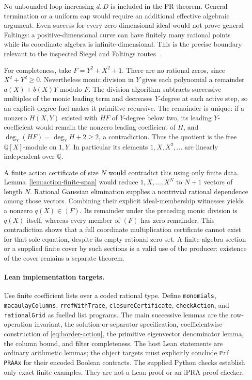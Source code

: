 No unbounded loop increasing $d,D$ is included in the PR theorem.
General termination or a uniform cap would require an additional
effective algebraic argument. Even success for every zero-dimensional
ideal would not prove general Faltings: a positive-dimensional curve
can have finitely many rational points while its coordinate algebra is
infinite-dimensional. This is the precise boundary relevant to the
inspected Siegel and Faltings routes~\cite{repo-siegel,repo-faltings}.

For completeness, take $F=Y^2+X^2+1$. There are no rational zeros, since
$X^2+Y^2\geq0$. Nevertheless monic division in $Y$ gives each polynomial
a remainder $a(X)+b(X)Y$ modulo $F$. The division algorithm subtracts
successive multiples of the monic leading term and decreases $Y$-degree
at each active step, so an explicit degree fuel makes it primitive
recursive. The remainder is unique: if a nonzero $H(X,Y)$ existed with
$HF$ of $Y$-degree below two, its leading $Y$-coefficient would remain
the nonzero leading coefficient of $H$, and
$\deg_Y(HF)=\deg_Y H+2\geq2$, a contradiction. Thus the quotient is
the free $\mathbb Q[X]$-module on $1,Y$. In particular its elements
$1,X,X^2,\ldots$ are linearly independent over $\mathbb Q$.

A finite action certificate of size $N$ would contradict this using only
finite data. Lemma~\ref{lem:action-finite-span} would reduce
$1,X,\ldots,X^N$ to $N+1$ vectors of length $N$. Rational Gaussian
elimination supplies a nontrivial rational dependence among those
vectors. Combining their explicit ideal-membership witnesses yields a
nonzero $q(X)\in(F)$. Its remainder under the preceding monic division
is $q(X)$ itself, whereas every member of $(F)$ has zero remainder.
This contradiction shows that a full coordinate multiplication
certificate cannot exist for that sole equation, despite its empty
rational zero set. A finite algebra section or a supplied finite cover
by such sections is a valid use of the producer; existence of the cover
remains a separate theorem.

\paragraph{Lean implementation targets.}
Use finite coefficient lists over a coded rational type. Define
\texttt{monomials}, \texttt{macaulayColumns}, \texttt{rrefWithTrace},
\texttt{closureCertificate}, \texttt{checkAction}, and
\texttt{rationalGrid} as fuelled list programs. The main successive lemmas
are the row-operation invariant, the solution-or-separator specification,
coefficientwise construction of \eqref{eq:border-action}, the primitive
eigenvector denominator lemma, the column bound, and filter completeness.
The host Lean statements are ordinary arithmetic lemmas; the object
targets must explicitly conclude \texttt{Prf PRAAx} for their encoded
Boolean contracts. The supplied Python checks establish only exact
finite examples. They are not a Lean proof or an iPRA proof checker.
